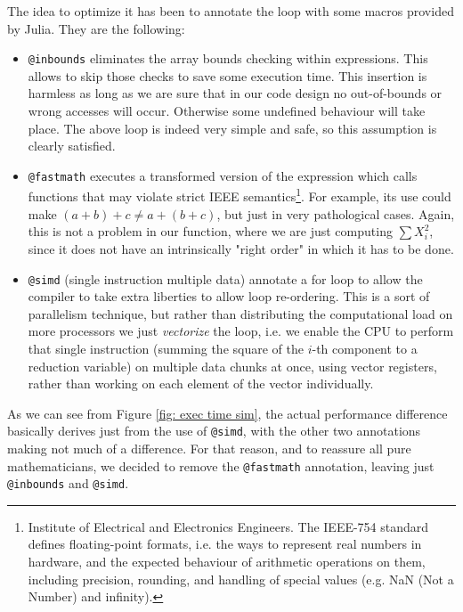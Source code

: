 \documentclass[12pt,	%
	a4paper,		%
	twoside,		%
	openright,		%
	titlepage,%
	]{book}
\theoremstyle{definition}
\newcommand{\mjline}[1]{\texttt{#1}}
\begin{document}
The idea to optimize it has been to annotate the loop with some macros provided by Julia. They are the following:
\begin{itemize}
    \item \mjline{@inbounds} eliminates the array bounds checking within expressions. This allows to skip those checks to save some execution time. This insertion is harmless as long as we are sure that in our code design no out-of-bounds or wrong accesses will occur. Otherwise some undefined behaviour will take place. The above loop is indeed very simple and safe, so this assumption is clearly satisfied. 
    
    \item \mjline{@fastmath} executes a transformed version of the expression which calls functions that may violate strict IEEE semantics\footnote{Institute of Electrical and Electronics Engineers. The IEEE-754 standard defines floating-point formats, i.e. the ways to represent real numbers in hardware, and the expected behaviour of arithmetic operations on them, including precision, rounding, and handling of special values (e.g. NaN (Not a Number) and infinity).}. For example, its use could make $(a+b)+c \neq a+(b+c)$, but just in very pathological cases. Again, this is not a problem in our function, where we are just computing $\sum X_i^2$, since it does not have an intrinsically "right order" in which it has to be done.
    
    \item \mjline{@simd} (single instruction multiple data) annotate a for loop to allow the compiler to take extra liberties to allow loop re-ordering. This is a sort of parallelism technique, but rather than distributing the computational load on more processors we just \textit{vectorize} the loop, i.e. we enable the CPU to perform that single instruction (summing the square of the $i$-th component to a reduction variable) on multiple data chunks at once, using vector registers, rather than working on each element of the vector individually.
\end{itemize}

As we can see from Figure \ref{fig: exec time sim}, the actual performance difference basically derives just from the use of \mjline{@simd}, with the other two annotations making not much of a difference. For that reason, and to reassure all pure mathematicians, we decided to remove the \mjline{@fastmath} annotation, leaving just \mjline{@inbounds} and \mjline{@simd}.
\end{document}
